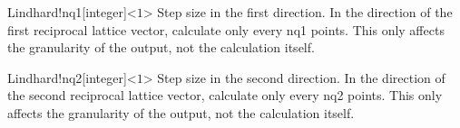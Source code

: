\begin{fdfentry}{Lindhard!nq1}[integer]<$1$>
    Step size in the first direction. In the direction of the first reciprocal
    lattice vector, calculate only every nq1 points. This only affects the
    granularity of the output, not the calculation itself.
\end{fdfentry}

\begin{fdfentry}{Lindhard!nq2}[integer]<$1$>
    Step size in the second direction. In the direction of the second reciprocal
    lattice vector, calculate only every nq2 points. This only affects the
    granularity of the output, not the calculation itself.
\end{fdfentry}